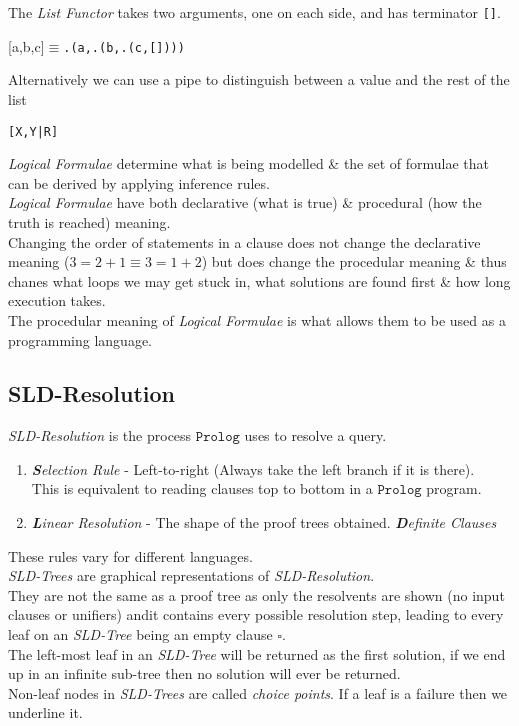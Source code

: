 \documentclass[11pt,a4paper]{article}
\begin{document}
The \textit{List Functor} takes two arguments, one on each side, and has terminator \lstinline![]!.
\begin{center}
[a,b,c]$\equiv$\lstinline!.(a,.(b,.(c,[])))!
\end{center}
Alternatively we can use a pipe to distinguish between a value and the rest of the list
\begin{center}
\lstinline![X,Y|R]!
\end{center}

\textit{Logical Formulae} determine what is being modelled \& the set of formulae that can be derived by applying inference rules.\\
\ie \textit{Logical Formulae} have both declarative (what is true) \& procedural (how the truth is reached) meaning.\\
Changing the order of statements in a clause does not change the declarative meaning ($3=2+1\equiv3=1+2$) but does change the procedular meaning \& thus chanes what loops we may get stuck in, what solutions are found first \& how long execution takes.\\
\nb The procedular meaning of \textit{Logical Formulae} is what allows them to be used as a programming language.

\subsection{SLD-Resolution}

\textit{SLD-Resolution} is the process $\mathtt{Prolog}$ uses to resolve a query.
\begin{enumerate}
	\item \textit{\textbf{S}election Rule} - Left-to-right (Always take the left branch if it is there).\\
	This is equivalent to reading clauses top to bottom in a $\mathtt{Prolog}$ program.
	\item \textit{\textbf{L}inear Resolution} - The shape of the proof trees obtained.
	\textit{\textbf{D}efinite Clauses}
\end{enumerate}
\nb These rules vary for different languages.\\

\textit{SLD-Trees} are graphical representations of \textit{SLD-Resolution}.\\
They are not the same as a proof tree as only the resolvents are shown (no input clauses or unifiers) andit contains every possible resolution step, leading to every leaf on an \textit{SLD-Tree} being an empty clause $\square$.\\
The left-most leaf in an \textit{SLD-Tree} will be returned as the first solution, if we end up in an infinite sub-tree then no solution will ever be returned.\\
Non-leaf nodes in \textit{SLD-Trees} are called \textit{choice points}.
\nb If a leaf is a failure then we underline it.\\
\end{document}
